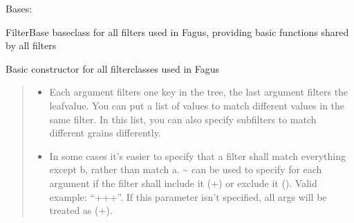 \documentclass[a4paper,10pt,english]{sphinxmanual}
\begin{document}
\begin{fulllineitems}
\label{\detokenize{fagus.filters:fagus.filters.FilBase}}
\pysigstartsignatures
{}
\pysigstopsignatures
\sphinxAtStartPar
Bases: 

\sphinxAtStartPar
FilterBase \sphinxhyphen{} base\sphinxhyphen{}class for all filters used in Fagus, providing basic functions shared by all filters

\begin{fulllineitems}
\label{\detokenize{fagus.filters:fagus.filters.FilBase.__init__}}
\pysigstartsignatures
{}
\pysigstopsignatures
\sphinxAtStartPar
Basic constructor for all filter\sphinxhyphen{}classes used in Fagus
\begin{quote}\begin{description}
\begin{itemize}
\item {}
\sphinxAtStartPar
{} \textendash{} Each argument filters one key in the tree, the last argument filters the leaf\sphinxhyphen{}value. You can
put a list of values to match different values in the same filter. In this list, you can also specify
subfilters to match different grains differently.

\item {}
\sphinxAtStartPar
{} \textendash{} In some cases it’s easier to specify that a filter shall match everything except b, rather than
match a. \textasciitilde{} can be used to specify for each argument if the filter shall include it (+) or exclude it
(\sphinxhyphen{}). Valid example: “++\sphinxhyphen{}+”. If this parameter isn’t specified, all args will be treated as (+).


\end{itemize}
\end{description}
\end{quote}
\end{fulllineitems}
\end{fulllineitems}
\end{document}
